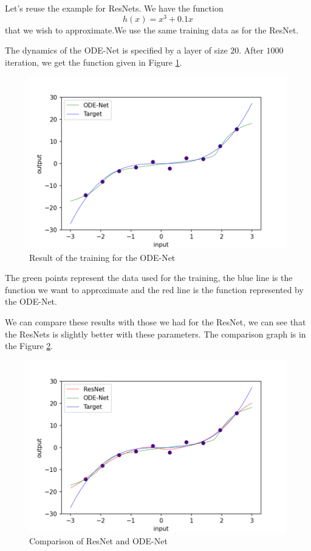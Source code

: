 \documentclass[10pt,a4paper]{article}
\theoremstyle{definition}
\theoremstyle{definition}
\theoremstyle{definition}
\begin{document}
Let's reuse the example for ResNets. We have the function 
$$
h(x) = x^3 + 0.1x
$$
that we wish to approximate.We use the same training data as for the ResNet.

The dynamics of the ODE-Net is specified by a layer of size $20$. After $1000$ iteration, we get the function given in Figure \ref{example_odenet}.

\begin{figure}[!h]
\center
\includegraphics[scale=0.4]{ex_odenet.png}
\caption{Result of the training for the ODE-Net}
\label{example_odenet}
\end{figure}

The green points represent the data used for the training, the blue line is the function we want to approximate and the red line is the function represented by the ODE-Net.

We can compare these results with those we had for the ResNet, we can see that the ResNets is slightly better with these parameters. The comparison graph is in the Figure \ref{comparaison}.
\begin{figure}[!h]
\center
\includegraphics[scale=0.45]{comparaison.png}
\caption{Comparison of ResNet and ODE-Net}
\label{comparaison}
\end{figure}
\end{document}
